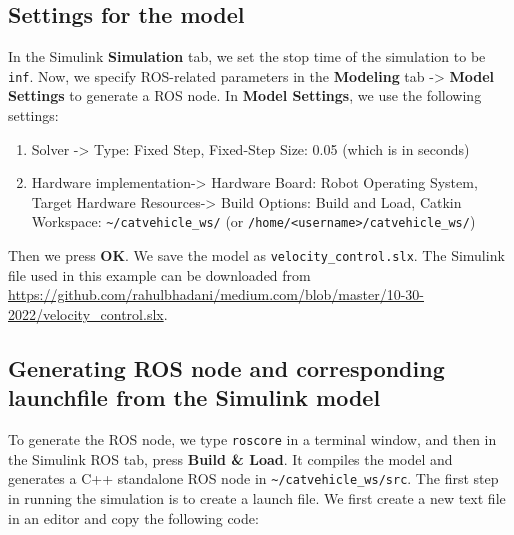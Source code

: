 \documentclass[
]{article}
\providecommand{\tightlist}{%
  \setlength{\itemsep}{0pt}\setlength{\parskip}{0pt}}
\begin{document}
\hypertarget{settings-for-the-model}{%
\subsection{Settings for the model}\label{settings-for-the-model}}

In the Simulink \textbf{Simulation} tab, we set the stop time of the
simulation to be \texttt{inf}. Now, we specify ROS-related parameters in
the \textbf{Modeling} tab -\textgreater{} \textbf{Model Settings} to
generate a ROS node. In \textbf{Model Settings}, we use the following
settings:

\begin{enumerate}
\def\labelenumi{\arabic{enumi}.}
\tightlist
\item
  Solver -\textgreater{} Type: Fixed Step, Fixed-Step Size: 0.05 (which
  is in seconds)
\item
  Hardware implementation-\textgreater{} Hardware Board: Robot Operating
  System, Target Hardware Resources-\textgreater{} Build Options: Build
  and Load, Catkin Workspace: \texttt{\textasciitilde{}/catvehicle\_ws/}
  (or \texttt{/home/\textless{}username\textgreater{}/catvehicle\_ws/})
\end{enumerate}

Then we press \textbf{OK}. We save the model as
\texttt{velocity\_control.slx}. The Simulink file used in this example
can be downloaded from
\url{https://github.com/rahulbhadani/medium.com/blob/master/10-30-2022/velocity_control.slx}.

\hypertarget{generating-ros-node-and-corresponding-launchfile-from-the-simulink-model}{%
\subsection{Generating ROS node and corresponding launchfile from the
Simulink
model}\label{generating-ros-node-and-corresponding-launchfile-from-the-simulink-model}}

To generate the ROS node, we type \texttt{roscore} in a terminal window,
and then in the Simulink ROS tab, press \textbf{Build \& Load}. It
compiles the model and generates a C++ standalone ROS node in
\texttt{\textasciitilde{}/catvehicle\_ws/src}. The first step in running
the simulation is to create a launch file. We first create a new text
file in an editor and copy the following code:
\end{document}
